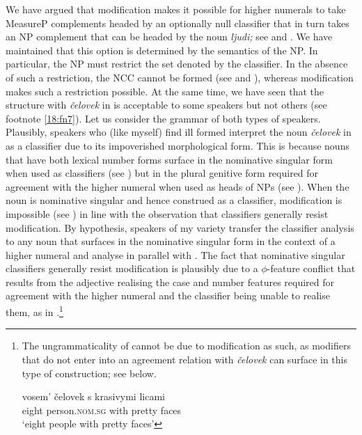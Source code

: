 \documentclass[output=paper,
modfonts,
newtxmath,
hidelinks
]{langscibook}
\begin{document}
We have argued that modification makes it possible for higher numerals to take MeasureP complements headed by an optionally null classifier that in turn takes an NP complement that can be headed by the noun \textit{ljudi;} see  and . We have maintained that this option is determined by the semantics of the NP. In particular, the NP must restrict the set denoted by the classifier. In the absence of such a restriction, the NCC cannot be formed (see  and ), whereas modification makes such a restriction possible. At the same time, we have seen that the structure with \textit{čelovek} in  is acceptable to some speakers but not others (see footnote \ref{18:fn7}). Let us consider the grammar of both types of speakers. Plausibly, speakers who (like myself) find  ill formed interpret the noun \textit{čelovek} in  as a classifier due to its impoverished morphological form. This is because nouns that have both lexical number forms surface in the nominative singular form when used as classifiers (see ) but in the plural genitive form required for agreement with the higher numeral when used as heads of NPs (see ). When the noun is nominative singular and hence construed as a classifier, modification is impossible (see ) in line with the observation that classifiers generally resist modification. By hypothesis, speakers of my variety transfer the classifier analysis to any noun that surfaces in the nominative singular form in the context of a higher numeral and analyse  in parallel with .
\ea \label{18:ex18}
	\z
\z
\largerpage[-2]
\noindent The fact that nominative singular classifiers generally resist modification is plausibly due to a ${\phi}$-feature conflict that results from the adjective realising the case and number features required for agreement with the higher numeral and the classifier being unable to realise them, as in .\footnote{\label{18:fn14}The ungrammaticality of  cannot be due to modification as such, as modifiers that do not enter into an agreement relation with \textit{čelovek} can surface in this type of construction; see  below.

\ea \label{18:fn14i}
\gll vosem’  čelovek    s   krasivymi   licami\\
eight  person.\textsc{nom.sg}  with  pretty    faces\\
\glt `eight people with pretty faces'
\zlast 
}
\end{document}
